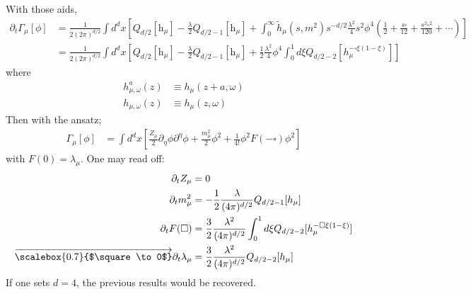 \documentclass[fleqn]{article}
\begin{document}
With those aids,
\begin{align}
  \partial _{t}\Gamma_{\mu}[\phi] &= \frac{1}{2(2\pi)^{d/2}}\int d^{d}x [Q_{d/2} [\text{h}_{\mu}] - \frac{\lambda}{2}Q_{d/2 -1}[\text{h}_{\mu}]+ \int_{0}^{\infty}\tilde{h}_{\mu}
  (s,m^{2})s^{-d/2}\frac{\lambda ^{2}}{4} s^{2} \phi ^{4}(\frac{1}{2}+\frac{s\square}{12}+ \frac{s^{2}\square ^{2}}{120} + \cdots)] \nonumber \\
  &= \frac{1}{2(2\pi)^{d/2}}\int d^{d}x [Q_{d/2} [\text{h}_{\mu}] - \frac{\lambda}{2}Q_{d/2 -1}[\text{h}_{\mu}]+ \frac{1}{2}\frac{\lambda^{2}}{4}\phi^{4} \int_{0}^{1} d\xi Q_{d/2 -2} [h_{\mu}^{-\square \xi (1-\xi)}] ]
\end{align}
where
\begin{align}
h_{\mu, \omega}^{a}(z) &\equiv h_{\mu} (z+a,\omega) \\
h_{\mu,\omega}(z) &\equiv h_{\mu}(z,\omega)
\end{align}
Then with the ansatz;
\begin{align}
\Gamma_{\mu} [\phi] &= \int d^{d}x [\frac{Z_{\mu}}{2} \partial_{\eta}\phi \partial^{\eta} \phi + \frac{m_{\mu}^{2}}{2}\phi^{2} + \frac{1}{4!} \phi^{2} F(-\square) \phi^{2}]
\end{align}
with $F(0) = \lambda_{\mu}$. One may read off:
\begin{align}
\partial_{t} Z_{\mu} & = 0 \\
\partial _{t} m_{\mu}^{2} &= -\frac{1}{2}\frac{\lambda}{(4\pi)^{d/2}} Q_{d/2 -1}[h_{\mu}] \\
\partial _{t} F(\square) &= \frac{3}{2}\frac{\lambda^{2}}{(4\pi)^{d/2}} \int_{0}^{1}d\xi Q_{d/2 -2}[h_{\mu}^{-\square \xi(1-\xi)}] \\
\overrightarrow{\scalebox {0.7}{$\square \to 0$}} \partial_{t}\lambda_{\mu} &=\frac{3}{2}\frac{\lambda^{2}}{(4\pi)^{d/2}}Q_{d/2-2}[h_{\mu}]
\end{align}
If one sets $d=4$, the previous results would be recovered.
\end{document}
